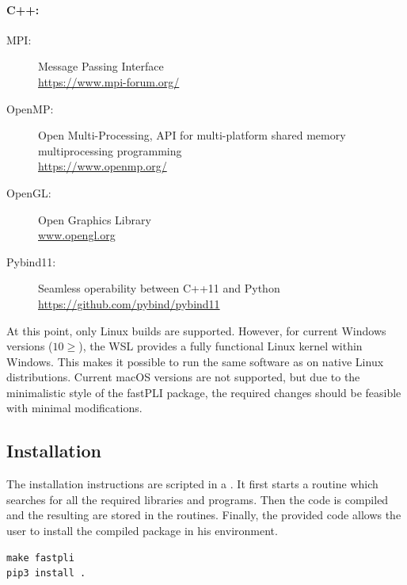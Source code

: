 \paragraph{C++:}
\begin{description}
\item[MPI:] Message Passing Interface \cite{message2015mpi}\\
\url{https://www.mpi-forum.org/}
\item[OpenMP:] Open Multi-Processing, API for multi-platform shared memory multiprocessing programming \cite{dagum1998openmp}\\
\url{https://www.openmp.org/}
\item[OpenGL:] Open Graphics Library \cite{khronos}\\
\url{www.opengl.org}
\item[Pybind11:] Seamless operability between C++11 and Python \cite{pybind11}\\ \url{https://github.com/pybind/pybind11}
\end{description}
%
%
At this point, only Linux builds are supported.
However, for current Windows versions ($10\geq$), the \ac{WSL} provides a fully functional Linux kernel within Windows.
This makes it possible to run the same software as on native Linux distributions.
Current macOS versions are not supported, but due to the minimalistic style of the \ac{fastPLI} package, the required changes should be feasible with minimal modifications.
%
%
%
\subsection{Installation}
%
The installation instructions are scripted in a .
It first starts a  routine which searches for all the required libraries and programs.
Then the \cpp{} code is compiled and the resulting  are stored in the \python{} routines.
Finally, the provided code  allows the user to install the compiled package in his environment.
%
\begin{lstfloat}[!ht]
\lstset{style=common}
\begin{lstlisting}
make fastpli
pip3 install .
\end{lstlisting}
\end{lstfloat}
%
%
%
